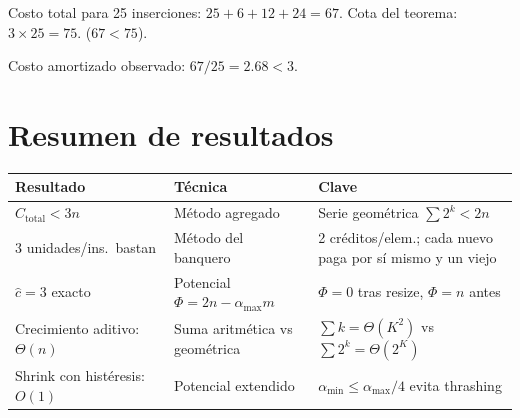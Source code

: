 \documentclass[11pt, letterpaper]{article}
\theoremstyle{definition}
\theoremstyle{plain}
\theoremstyle{remark}
\begin{document}
Costo total para 25 inserciones: $25 + 6 + 12 + 24 = 67$.
Cota del teorema: $3 \times 25 = 75$. \checkmark \quad ($67 < 75$).

Costo amortizado observado: $67/25 = 2.68 < 3$. \checkmark

\section{Resumen de resultados}

\begin{table}[h]
\centering
\begin{tabular}{llp{5.5cm}}
\toprule
\textbf{Resultado} & \textbf{Técnica} & \textbf{Clave} \\
\midrule
$C_{\text{total}} < 3n$
  & Método agregado
  & Serie geométrica $\sum 2^k < 2n$ \\
3 unidades/ins.\ bastan
  & Método del banquero
  & 2 créditos/elem.; cada nuevo paga por sí mismo y un viejo \\
$\hat{c} = 3$ exacto
  & Potencial $\Phi = 2n {-} \alpha_{\max}m$
  & $\Phi = 0$ tras resize, $\Phi = n$ antes \\
Crecimiento aditivo: $\Theta(n)$
  & Suma aritmética vs geométrica
  & $\sum k = \Theta(K^2)$ vs $\sum 2^k = \Theta(2^K)$ \\
Shrink con histéresis: $O(1)$
  & Potencial extendido
  & $\alpha_{\min} \leq \alpha_{\max}/4$ evita thrashing \\
\bottomrule
\end{tabular}
\end{table}
\end{document}
